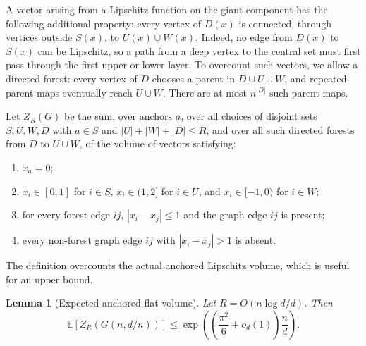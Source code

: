 \documentclass[11pt]{article}
\newtheorem{lemma}[theorem]{Lemma}
\theoremstyle{definition}
\newcommand{\EE}{\mathbb{E}}
\begin{document}
\bigskip
\noindent
A vector arising from a Lipschitz function on the giant component has the following additional property: every vertex of $D(x)$ is connected, through vertices outside $S(x)$, to $U(x)\cup W(x)$.  Indeed, no edge from $D(x)$ to $S(x)$ can be Lipschitz, so a path from a deep vertex to the central set must first pass through the first upper or lower layer.  To overcount such vectors, we allow a directed forest: every vertex of $D$ chooses a parent in $D\cup U\cup W$, and repeated parent maps eventually reach $U\cup W$.  There are at most $n^{|D|}$ such parent maps.

\bigskip
\noindent
Let $Z_R(G)$ be the sum, over anchors $a$, over all choices of disjoint sets $S,U,W,D$ with $a\in S$ and $|U|+|W|+|D|\le R$, and over all such directed forests from $D$ to $U\cup W$, of the volume of vectors satisfying:
\begin{enumerate}[label=(\roman*)]
\item $x_a=0$;
\item $x_i\in[0,1]$ for $i\in S$, $x_i\in(1,2]$ for $i\in U$, and $x_i\in[-1,0)$ for $i\in W$;
\item for every forest edge $ij$, $|x_i-x_j|\le1$ and the graph edge $ij$ is present;
\item every non-forest graph edge $ij$ with $|x_i-x_j|>1$ is absent.
\end{enumerate}
The definition overcounts the actual anchored Lipschitz volume, which is useful for an upper bound.

\begin{lemma}[Expected anchored flat volume]\label{lem:expected-Z}
Let $R=O(n\log d/d)$.  Then
\begin{equation}\label{eq:expected-Z}
  \EE \left[Z_R(G(n,d/n))\right]
  \le \exp\left(\left(\frac{\pi^2}{6}+o_d(1)\right)\frac nd\right).
\end{equation}
\end{lemma}
\end{document}
